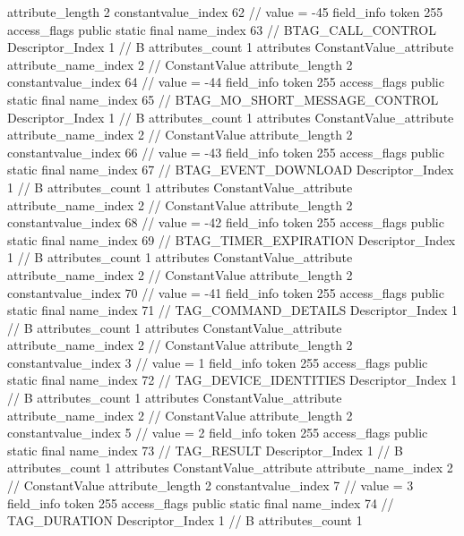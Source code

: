 {{{{{{{					attribute_length	2
					constantvalue_index	62		// value = -45
				}
				}
			}
			field_info {
				token	255
				access_flags	public static final
				name_index	63		// BTAG_CALL_CONTROL
				Descriptor_Index	1		// B
				attributes_count	1
				attributes {
				ConstantValue_attribute {
					attribute_name_index	2		// ConstantValue
					attribute_length	2
					constantvalue_index	64		// value = -44
				}
				}
			}
			field_info {
				token	255
				access_flags	public static final
				name_index	65		// BTAG_MO_SHORT_MESSAGE_CONTROL
				Descriptor_Index	1		// B
				attributes_count	1
				attributes {
				ConstantValue_attribute {
					attribute_name_index	2		// ConstantValue
					attribute_length	2
					constantvalue_index	66		// value = -43
				}
				}
			}
			field_info {
				token	255
				access_flags	public static final
				name_index	67		// BTAG_EVENT_DOWNLOAD
				Descriptor_Index	1		// B
				attributes_count	1
				attributes {
				ConstantValue_attribute {
					attribute_name_index	2		// ConstantValue
					attribute_length	2
					constantvalue_index	68		// value = -42
				}
				}
			}
			field_info {
				token	255
				access_flags	public static final
				name_index	69		// BTAG_TIMER_EXPIRATION
				Descriptor_Index	1		// B
				attributes_count	1
				attributes {
				ConstantValue_attribute {
					attribute_name_index	2		// ConstantValue
					attribute_length	2
					constantvalue_index	70		// value = -41
				}
				}
			}
			field_info {
				token	255
				access_flags	public static final
				name_index	71		// TAG_COMMAND_DETAILS
				Descriptor_Index	1		// B
				attributes_count	1
				attributes {
				ConstantValue_attribute {
					attribute_name_index	2		// ConstantValue
					attribute_length	2
					constantvalue_index	3		// value = 1
				}
				}
			}
			field_info {
				token	255
				access_flags	public static final
				name_index	72		// TAG_DEVICE_IDENTITIES
				Descriptor_Index	1		// B
				attributes_count	1
				attributes {
				ConstantValue_attribute {
					attribute_name_index	2		// ConstantValue
					attribute_length	2
					constantvalue_index	5		// value = 2
				}
				}
			}
			field_info {
				token	255
				access_flags	public static final
				name_index	73		// TAG_RESULT
				Descriptor_Index	1		// B
				attributes_count	1
				attributes {
				ConstantValue_attribute {
					attribute_name_index	2		// ConstantValue
					attribute_length	2
					constantvalue_index	7		// value = 3
				}
				}
			}
			field_info {
				token	255
				access_flags	public static final
				name_index	74		// TAG_DURATION
				Descriptor_Index	1		// B
				attributes_count	1
}}}}}
